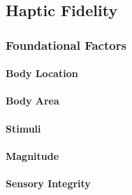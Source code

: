 \subsection{Haptic Fidelity}
\subsubsection{Foundational Factors}
\paragraph{Body Location}

\paragraph{Body Area} 
\paragraph{Stimuli}
\paragraph{Magnitude}
\paragraph{Sensory Integrity}

